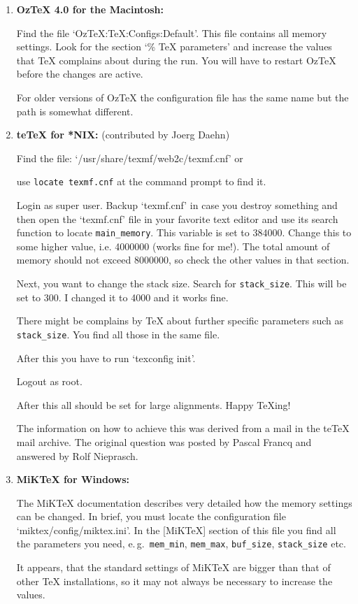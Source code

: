\documentclass[12pt]{article}
\begin{document}
\begin{enumerate}
    
    \item
    
    \textbf{Oz\TeX{} 4.0 for the Macintosh:}
    
    Find the file `OzTeX:TeX:Configs:Default'. This file contains
    all memory settings. Look for the section 
    `\% TeX parameters' and increase the values that \TeX{} complains
    about during the run. You will have to restart Oz\TeX{} before the
    changes are active.
    
    For older versions of Oz\TeX{} the configuration file has the 
    same name but the path is somewhat different.
    
    
    \item
    
    \textbf{te\TeX{} for *NIX:} (contributed by Joerg Daehn)
    
    Find the file: `/usr/share/texmf/web2c/texmf.cnf' or
    
    use \verb|locate texmf.cnf| at the command prompt to find it.

    Login as super user. Backup `texmf.cnf' in case you destroy something and
    then open the `texmf.cnf' file in your favorite text editor and use its
    search function to locate \verb|main_memory|. This variable is set to 384000.
    Change this to some higher value, i.e. 4000000 (works fine for me!). The
    total amount of memory should not exceed 8000000, so check the other
    values in that section. 

    Next, you want to change the stack size. Search for \verb|stack_size|. This
    will be set to 300. I changed it to 4000 and it works fine.

    There might be complains by \TeX{} about further specific parameters such
    as \verb|stack_size|. You find all those in the same file.

    After this you have to run `texconfig init'.

    Logout as root.

    After this all should be set for large alignments. Happy \TeX{}ing!

    The information on how to achieve this was derived from a mail in the
    te\TeX{} mail archive. The original question was posted by Pascal Francq and
    answered by Rolf Nieprasch.

    
    \item
    
    \textbf{MiK\TeX{} for Windows:}
    
    The MiK\TeX{} documentation describes very detailed how the memory
    settings can be changed. In brief, you must locate the 
    configuration file `miktex/config/miktex.ini'. In the [MiKTeX] 
    section of this file you find all the parameters you need, e.\,g.\ 
    \verb|mem_min|, \verb|mem_max|, \verb|buf_size|, \verb|stack_size| etc.
    
    It appears, that the standard settings of MiK\TeX{} are bigger 
    than that of other \TeX{} installations, so it may not always be necessary 
    to increase the values.
    
    
\end{enumerate}
\end{document}
